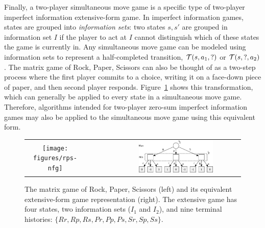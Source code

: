 Finally, a two-player simultaneous move game is a specific type of two-player imperfect information extensive-form game.
In imperfect information
games, states are grouped into {\it information sets}: two states $s, s'$ are grouped in information set $I$ if the player
to act at $I$ cannot distinguish which of these states the game is currently in. Any simultaneous move game can be modeled
using information sets to represent a half-completed transition, \ie $\mathcal{T}(s, a_1, ?)$ or $\mathcal{T}(s, ?, a_2)$.
The matrix game of Rock, Paper, Scissors can also be thought of as a two-step process where the first player commits
to a choice, writing it on a face-down piece of paper, and then second player responds. Figure~\ref{fig:rps-equiv} shows this
transformation, which can generally be applied to every state in a simultaneous move game.
Therefore, algorithms intended for two-player zero-sum imperfect information games may also be applied to the
simultaneous move game using this equivalent form.

\begin{figure}
\begin{center}
\begin{tabular}{ccc}
\texttt{[image: figures/rps-nfg]} & ~~~~~ & \includegraphics[width=0.6\textwidth]{figures/rps-new} \\
\end{tabular}
\end{center}
\caption{The matrix game of Rock, Paper, Scissors (left) and its equivalent extensive-form game representation (right). The extensive
game has four states, two information sets ($I_1$ and $I_2$),
and nine terminal histories: $\{ Rr, Rp, Rs, Pr, Pp, Ps, Sr, Sp, Ss \}$. \label{fig:rps-equiv}}
\end{figure}


